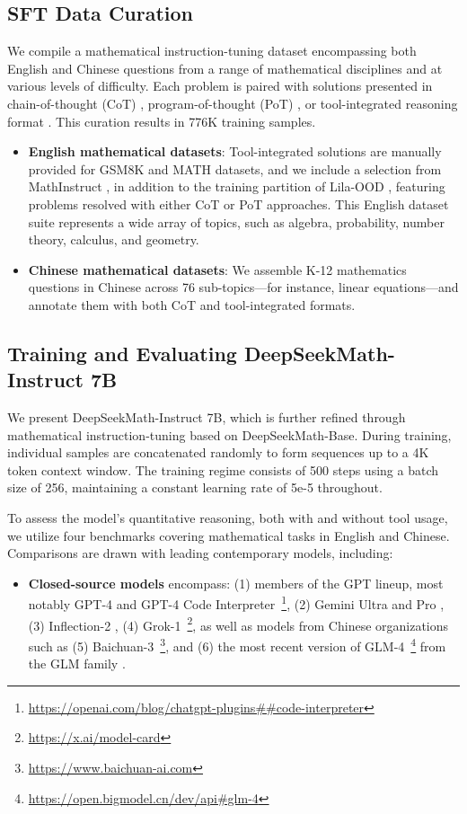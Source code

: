 \subsection{SFT Data Curation}

We compile a mathematical instruction-tuning dataset encompassing both English and Chinese questions from a range of mathematical disciplines and at various levels of difficulty. Each problem is paired with solutions presented in chain-of-thought (CoT) \citep{cot}, program-of-thought (PoT) \citep{pot,pal}, or tool-integrated reasoning format \citep{tora}. This curation results in 776K training samples.

\begin{itemize}[topsep=0pt]
    \item \textbf{English mathematical datasets}: Tool-integrated solutions are manually provided for GSM8K and MATH datasets, and we include a selection from MathInstruct \citep{MathInstruct}, in addition to the training partition of Lila-OOD \citep{lila}, featuring problems resolved with either CoT or PoT approaches. This English dataset suite represents a wide array of topics, such as algebra, probability, number theory, calculus, and geometry.
    \item \textbf{Chinese mathematical datasets}: We assemble K-12 mathematics questions in Chinese across 76 sub-topics—for instance, linear equations—and annotate them with both CoT and tool-integrated formats.
\end{itemize}

\subsection{Training and Evaluating DeepSeekMath-Instruct 7B}

We present DeepSeekMath-Instruct 7B, which is further refined through mathematical instruction-tuning based on DeepSeekMath-Base. During training, individual samples are concatenated randomly to form sequences up to a 4K token context window. The training regime consists of 500 steps using a batch size of 256, maintaining a constant learning rate of 5e-5 throughout.

To assess the model’s quantitative reasoning, both with and without tool usage, we utilize four benchmarks covering mathematical tasks in English and Chinese. Comparisons are drawn with leading contemporary models, including:

\begin{itemize}[topsep=0pt]
    \item \textbf{Closed-source models} encompass: (1) members of the GPT lineup, most notably GPT-4 \citep{gpt4} and GPT-4 Code Interpreter~\footnote{\url{https://openai.com/blog/chatgpt-plugins\#\#code-interpreter}}, (2) Gemini Ultra and Pro \citep{gemini}, (3) Inflection-2 \citep{inflection-2}, (4) Grok-1~\footnote{\url{https://x.ai/model-card}}, as well as models from Chinese organizations such as (5) Baichuan-3~\footnote{\url{https://www.baichuan-ai.com}}, and (6) the most recent version of GLM-4~\footnote{\url{https://open.bigmodel.cn/dev/api\#glm-4}} from the GLM family \citep{glm}.
\end{itemize}

